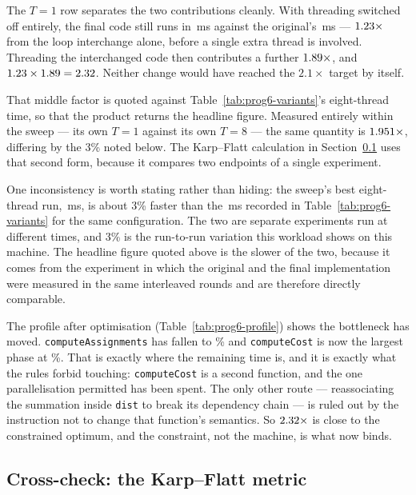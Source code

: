 \documentclass[11pt,a4paper]{article}
\newcommand{\ms}[1]{#1\,ms}
\begin{document}
The $T = 1$ row separates the two contributions cleanly. With threading
switched off entirely, the final code still runs in
\ms{\prognSixOneThreadMs} against the original's \ms{\prognSixBaselineMs}
--- $1.23\times$ from the loop interchange alone, before
a single extra thread is involved. Threading the interchanged code then
contributes a further $1.89\times$, and
$1.23 \times 1.89 = 2.32$.
Neither change would have reached the $2.1\times$ target by itself.

That middle factor is quoted against Table~\ref{tab:prog6-variants}'s
eight-thread time, so that the product returns the headline figure. Measured
entirely within the sweep --- its own $T=1$ against its own $T=8$ --- the same
quantity is $1.951\times$, differing by the 3\% noted below. The
Karp--Flatt calculation in Section~\ref{sec:p6karp} uses that second form,
because it compares two endpoints of a single experiment.

One inconsistency is worth stating rather than hiding: the sweep's best
eight-thread run, \ms{\prognSixSweepBestMs}, is about 3\% faster than the
\ms{\prognSixFinalMs} recorded in Table~\ref{tab:prog6-variants} for the same
configuration. The two are separate experiments run at different times, and 3\%
is the run-to-run variation this workload shows on this machine. The headline
figure quoted above is the slower of the two, because it comes from the
experiment in which the original and the final implementation were measured in
the same interleaved rounds and are therefore directly comparable.

The profile after optimisation (Table~\ref{tab:prog6-profile}) shows the
bottleneck has moved. \texttt{computeAssignments} has fallen to
\prognSixAssignShareAfter\% and \texttt{computeCost} is now the largest phase
at \prognSixCostShareAfter\%. That is exactly where the remaining time is, and
it is exactly what the rules forbid touching: \texttt{computeCost} is a second
function, and the one parallelisation permitted has been spent. The only other
route --- reassociating the summation inside \texttt{dist} to break its
dependency chain --- is ruled out by the instruction not to change that
function's semantics. So $2.32\times$ is close to the constrained
optimum, and the constraint, not the machine, is what now binds.

\subsection{Cross-check: the Karp--Flatt metric}
\label{sec:p6karp}
\end{document}
